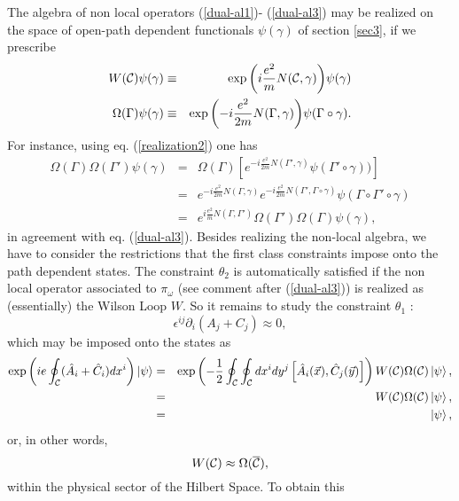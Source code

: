 \documentclass[a4paper,12pt]{article}
\newcommand{\ket}[1]{\left|#1\right\rangle}
\newcommand{\con}[2]{\left[#1,#2\right]}
\newcommand{\eref}[1]{(\ref{#1})}
\begin{document}
The algebra of non local operators \eref{dual-al1}-
\eref{dual-al3} may be realized on the space of open-path
dependent functionals $\psi(\gamma)$ of section \ref{sec3}, if we
prescribe
\begin{eqnarray}
W(\cal C)\psi(\gamma)&\equiv&\exp{\left(i\frac{e^2}m
N({\cal C,\gamma})\right)}\psi(\gamma)\label{realization1}\\
\Omega(\Gamma)\psi(\gamma)&\equiv&
\exp{\left(-i\frac{e^2}{2m}N(\Gamma,\gamma)\right)}
\psi(\Gamma\circ\gamma).\label{realization2}
\end{eqnarray}
For instance, using eq. \eref{realization2} one has
\begin{eqnarray}
\Omega(\Gamma)\Omega(\Gamma')\psi(\gamma)&=&\Omega(\Gamma)
\left[e^{-i\frac{e^2}{2m}N(\Gamma',\gamma)}\psi(\Gamma'\circ\gamma))
\right]\nonumber\\
                                          &=&e^{-i\frac{e^2}{2m}
N(\Gamma,\gamma)}e^{-i\frac{e^2}{2m}
N(\Gamma',\Gamma\circ\gamma)}\psi(\Gamma\circ\Gamma'\circ\gamma)\nonumber\\
                                          &=&e^{i\frac{e^2}m
N(\Gamma,\Gamma')}\Omega(\Gamma')\Omega(\Gamma)\psi(\gamma),
\end{eqnarray}
in agreement with eq. \eref{dual-al3}. Besides realizing the
non-local algebra, we have to consider the restrictions that the
first class constraints impose onto the path dependent states. The
constraint $\theta_2$ is automatically satisfied if the non local
operator associated to $\pi_\omega$ (see comment after
\eref{dual-al3}) is realized as (essentially) the Wilson Loop $W$.
So it remains to study the constraint $\theta_1$ :
\begin{equation}
\epsilon^{ij}\partial_i(A_j+C_j)\approx 0,
\end{equation}
which may be imposed onto the states as
\begin{eqnarray}
\exp{\left(ie\oint_{{\cal C}}(\hat A_i+\hat C_i)dx^i\right)}\ket\psi
&=&\exp\left(-\frac12\oint_{\cal C}\oint_{\cal C}dx^idy^j\con{\hat A_i(\vec x)}
{\hat C_j(\vec y)}\right)W({\cal C})\Omega({\cal C})\ket\psi,\nonumber \\
&=&W({\cal C})\Omega({\cal C})\ket\psi,\nonumber \\
&=&\ket\psi, \label{Vin-NL}
\end{eqnarray}
or, in other words,
\begin{equation}
W({\cal C}) \approx \Omega(\overline{\cal C}),  \label{phys}
\end{equation}
within the physical sector of the Hilbert Space. To obtain this
\end{document}
